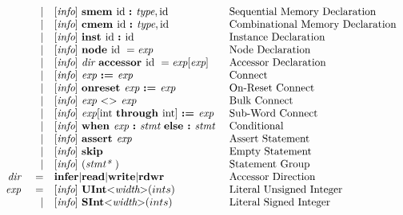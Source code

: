 \documentclass[12pt]{article}
\begin{document}
{\[\begin{array}{rrll}
                &\vert &[\text{\em info}]\  \text{\bf smem\ } \text{id } \text{\bf :\ } \text{\em type} , \text{id}                                  &\text{Sequential Memory Declaration}\\
                &\vert &[\text{\em info}]\  \text{\bf cmem\ } \text{id } \text{\bf :\ } \text{\em type} , \text{id}                                  &\text{Combinational Memory Declaration}\\
                &\vert &[\text{\em info}]\  \text{\bf inst\ } \text{id } \text{\bf :\ } \text{id }                                                &\text{Instance Declaration}\\
                &\vert &[\text{\em info}]\  \text{\bf node\ } \text{id }  = \text{\em exp\ }                                               &\text{Node Declaration}\\
                &\vert &[\text{\em info}]\  \text{\em dir\ } \text{\bf accessor\ } \text{id } = \text{\em exp}[\text{\em exp}]                       &\text{Accessor Declaration}\\
                &\vert &[\text{\em info}]\  \text{\em exp\ } \text{\bf :=\ } \text{\em exp\ }                                               &\text{Connect}\\
                &\vert &[\text{\em info}]\  \text{\bf onreset\ } \text{\em exp\ } \text{\bf :=\ } \text{\em exp\ }                                  &\text{On-Reset Connect}\\
                &\vert &[\text{\em info}]\  \text{\em exp\ } \text{\bf $<>$\ } \text{\em exp\ }                                             &\text{Bulk Connect}\\
                &\vert &[\text{\em info}]\  \text{\em exp}[\text{int }  \text{\bf through\ } \text{int}] \ \text{\bf :=\ } \text{\em exp}               &\text{Sub-Word Connect}\\
                &\vert &[\text{\em info}]\  \text{\bf when\ } \text{\em exp\ } \text{\bf :\ } \text{\em stmt\ } \text{\bf else :\ } \text{\em stmt\ }               &\text{Conditional}\\
                &\vert &[\text{\em info}]\  \text{\bf assert\ } \text{\em exp\ }                                                    &\text{Assert Statement}\\
                &\vert &[\text{\em info}]\  \text{\bf skip\ }                                                               &\text{Empty Statement}\\
                &\vert &[\text{\em info}]\  (\text{\em stmt*\ })                                                            &\text{Statement Group}\\
\text{\em dir\ }        &=     &\text{\bf infer} \vert \text{\bf read} \vert \text{\bf write} \vert \text{\bf rdwr\ }                &\text{Accessor Direction}\\
\text{\em exp\ }        &=     &[\text{\em info}]\  \text{\bf UInt} \text{\bf $<$} \text{\em width} \text{\bf $>$}(ints)                        &\text{Literal Unsigned Integer}\\
                &\vert &[\text{\em info}]\  \text{\bf SInt} \text{\bf $<$} \text{\em width} \text{\bf $>$}(ints)                        &\text{Literal Signed Integer}\\

\end{array}\]}
\end{document}
